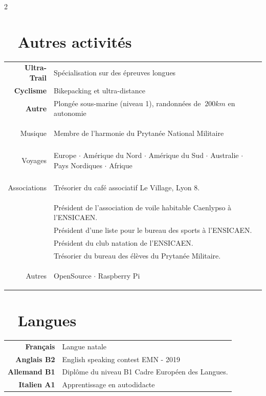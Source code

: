 \documentclass{modernsimplecv}
\newlength{\rightcolwidth}
\begin{document}
\begin{paracol}{2}
\begin{tcolorbox}[boxsep=-1mm, boxrule=0.1mm, boxrule=0mm,colframe=shadecolor,colback=shadecolor]
\begin{minipage}[t]{\rightcolwidth}
			\section*{\faSunO ~ Autres activités}
			\begin{tabular}{>{\footnotesize\bfseries}r >{\footnotesize}p{}}
                Ultra-Trail & Spécialisation sur des épreuves longues \\
                Cyclisme & Bikepacking et ultra-distance \\
                Autre & Plongée sous-marine (niveau 1), randonnées de \(~ 200 km\) en autonomie \\
				\rule{0pt}{3ex}
				Musique & Membre de l’harmonie du Prytanée National Militaire \\
				\rule{0pt}{3ex}
				Voyages & Europe $\cdot$ Amérique du Nord $\cdot$ Amérique du Sud $\cdot$ Australie $\cdot$ Pays Nordiques $\cdot$ Afrique \\
				\rule{0pt}{3ex}
				Associations    & Trésorier du café associatif \og Le Village\fg{}, Lyon 8. \\  
                                & Président de l’association de voile habitable Caenlypso à l’ENSICAEN. \\
                                & Président d'une liste pour le bureau des sports à l'ENSICAEN. \\
				                & Président du club natation de l’ENSICAEN. \\
				                & Trésorier du bureau des élèves du Prytanée Militaire. \\
				\rule{0pt}{3ex}
				Autres & OpenSource $\cdot$ Raspberry Pi 
			\end{tabular}
			\vspace{0em}
		\end{minipage}

		\begin{minipage}[t]{\rightcolwidth}
			\section*{\faComments ~ Langues}
			\begin{tabular}{>{\footnotesize\bfseries}r >{\footnotesize}p{}}
				Français    & Langue natale                                             \\
				Anglais B2  & \og English speaking contest EMN - 2019\fg{}                     \\
				Allemand B1 & Diplôme du niveau B1 Cadre Européen des Langues. \\
				Italien A1    & Apprentissage en autodidacte
			\end{tabular}
		\end{minipage}
	\end{tcolorbox}


\end{paracol}
\end{document}
